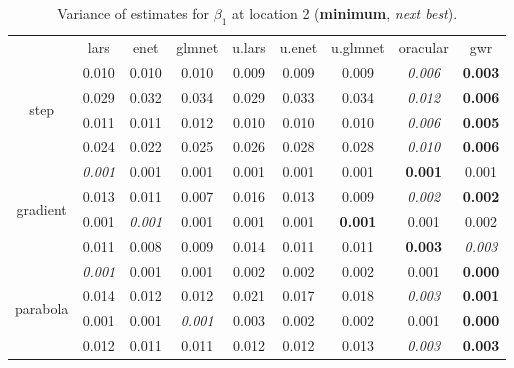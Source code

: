 \documentclass[authoryear, review, 11pt]{elsarticle}
\begin{document}
\begin{table}[ht]
\begin{center}
\begin{tabular}{ccccccccc}
  & lars & enet & glmnet & u.lars & u.enet & u.glmnet & oracular & gwr \\ 
  \cline{2-9}
  \multirow{4}{*}{step} & 0.010 & 0.010 & 0.010 & 0.009 & 0.009 & 0.009 & \emph{0.006} & \textbf{0.003} \\ 
  & 0.029 & 0.032 & 0.034 & 0.029 & 0.033 & 0.034 & \emph{0.012} & \textbf{0.006} \\ 
  & 0.011 & 0.011 & 0.012 & 0.010 & 0.010 & 0.010 & \emph{0.006} & \textbf{0.005} \\ 
  & 0.024 & 0.022 & 0.025 & 0.026 & 0.028 & 0.028 & \emph{0.010} & \textbf{0.006} \\ 
  \cline{2-9}
  \multirow{4}{*}{gradient} & \emph{0.001} & 0.001 & 0.001 & 0.001 & 0.001 & 0.001 & \textbf{0.001} & 0.001 \\ 
  & 0.013 & 0.011 & 0.007 & 0.016 & 0.013 & 0.009 & \emph{0.002} & \textbf{0.002} \\ 
  & 0.001 & \emph{0.001} & 0.001 & 0.001 & 0.001 & \textbf{0.001} & 0.001 & 0.002 \\ 
  & 0.011 & 0.008 & 0.009 & 0.014 & 0.011 & 0.011 & \textbf{0.003} & \emph{0.003} \\ 
  \cline{2-9}
  \multirow{4}{*}{parabola} & \emph{0.001} & 0.001 & 0.001 & 0.002 & 0.002 & 0.002 & 0.001 & \textbf{0.000} \\ 
  & 0.014 & 0.012 & 0.012 & 0.021 & 0.017 & 0.018 & \emph{0.003} & \textbf{0.001} \\ 
  & 0.001 & 0.001 & \emph{0.001} & 0.003 & 0.002 & 0.002 & 0.001 & \textbf{0.000} \\ 
  & 0.012 & 0.011 & 0.011 & 0.012 & 0.012 & 0.013 & \emph{0.003} & \textbf{0.003} \\ 
  \end{tabular}
\caption{Variance of estimates for $\beta_1$ at location 2 (\textbf{minimum}, \emph{next best}).\label{table:loc2-X1-varx}}
\end{center}
\end{table}
\end{document}
